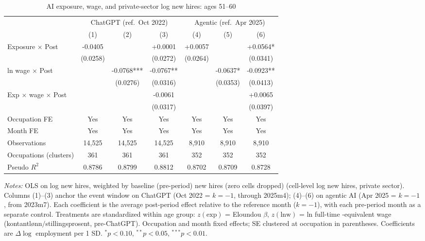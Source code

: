 \begin{table}[htbp]\centering
\caption{AI exposure, wage, and private-sector log new hires: ages 51–60}
\label{tab:ca_did_age4}
\small
\begin{tabular}{lcccccc}
\toprule
 & \multicolumn{3}{c}{ChatGPT (ref.\ Oct 2022)} & \multicolumn{3}{c}{Agentic (ref.\ Apr 2025)} \\
\cmidrule(lr){2-4} \cmidrule(lr){5-7}
 & (1) & (2) & (3) & (4) & (5) & (6) \\
\midrule
Exposure $\times$ Post & -0.0405 &  & +0.0001 & +0.0057 &  & +0.0564* \\
 & (0.0258) &  & (0.0272) & (0.0264) &  & (0.0341) \\
ln wage $\times$ Post &  & -0.0768*** & -0.0767** &  & -0.0637* & -0.0923** \\
 &  & (0.0276) & (0.0316) &  & (0.0353) & (0.0413) \\
Exp $\times$ wage $\times$ Post &  &  & -0.0061 &  &  & +0.0065 \\
 &  &  & (0.0317) &  &  & (0.0397) \\
\midrule
Occupation FE & Yes & Yes & Yes & Yes & Yes & Yes \\
Month FE & Yes & Yes & Yes & Yes & Yes & Yes \\
Observations & 14,525 & 14,525 & 14,525 & 8,910 & 8,910 & 8,910 \\
Occupations (clusters) & 361 & 361 & 361 & 352 & 352 & 352 \\
Pseudo $R^2$ & 0.8786 & 0.8799 & 0.8812 & 0.8702 & 0.8709 & 0.8728 \\
\bottomrule
\end{tabular}
\begin{minipage}{\linewidth}\vspace{2pt}\footnotesize
\emph{Notes:} OLS on log new hires, weighted by baseline (pre-period) new hires (zero cells dropped) (cell-level log new hires, private sector). Columns (1)--(3) anchor the event window on ChatGPT (Oct 2022 = $k{=}{-}1$, through 2025m4); (4)--(6) on agentic AI (Apr 2025 = $k{=}{-}1$, from 2023m7). Each coefficient is the average post-period effect relative to the reference month ($k{=}{-}1$), with each pre-period month as a separate control. Treatments are standardized within age group: $z(\text{exp})$ = Eloundou $\beta$, $z(\text{lnw})$ = ln full-time -equivalent wage (kontantl\o nn$/$stillingsprosent, pre-ChatGPT). Occupation and month fixed effects; SE clustered at occupation in parentheses. Coefficients are $\Delta\log$ employment per 1 SD. $^{*}p<0.10$, $^{**}p<0.05$, $^{***}p<0.01$.
\end{minipage}
\end{table}